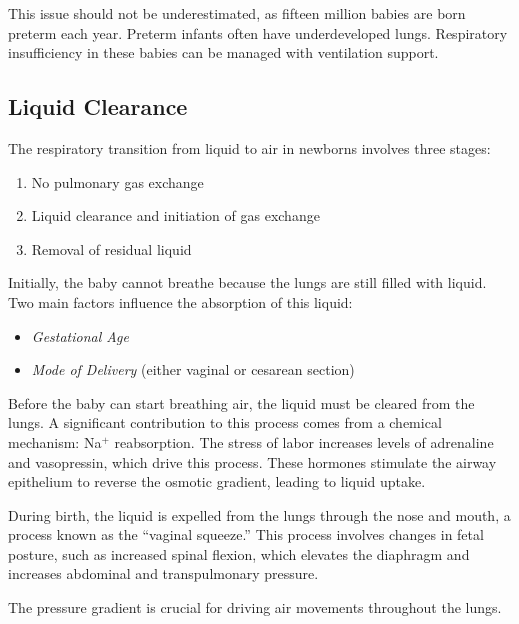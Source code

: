 

This issue should not be underestimated, as fifteen million babies are
born preterm each year\cite{who2013}.  Preterm infants often have
underdeveloped lungs.  Respiratory insufficiency in these babies can
be managed with ventilation support.

\subsection{Liquid Clearance}
\label{subsec:liquid_clearance}

The respiratory transition from liquid to air in newborns involves
three stages:
\begin{enumerate}
\item No pulmonary gas exchange
\item Liquid clearance and initiation of gas exchange
\item Removal of residual liquid
\end{enumerate}

Initially, the baby cannot breathe because the lungs are still filled
with liquid. Two main factors influence the absorption of this liquid:
\begin{itemize}
\item \emph{Gestational Age}
\item \emph{Mode of Delivery} (either vaginal or cesarean section)
\end{itemize}

Before the baby can start breathing air, the liquid must be cleared
from the lungs. A significant contribution to this process comes from
a chemical mechanism: Na$^{\text{+}}$ reabsorption. The stress of
labor increases levels of adrenaline and vasopressin, which drive this
process. These hormones stimulate the airway epithelium to reverse the
osmotic gradient, leading to liquid uptake.

During birth, the liquid is expelled from the lungs through the nose
and mouth, a process known as the ``vaginal squeeze.'' This process
involves changes in fetal posture, such as increased spinal flexion,
which elevates the diaphragm and increases abdominal and
transpulmonary pressure.

The pressure gradient is crucial for driving air movements throughout
the lungs.


